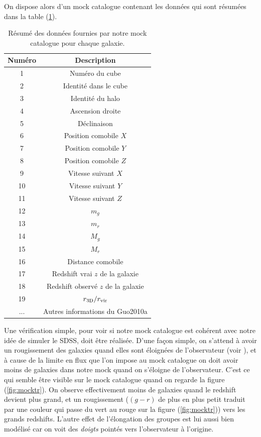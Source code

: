 On dispose alors d'un mock catalogue contenant les données qui sont résumées dans la table (\ref{tab:donnees}).
\begin{table}[htb]
        \footnotesize
	\centering
	\begin{tabular}{| >{\columncolor{bleu2}} c| >{\columncolor{bleu3}} c|}
	        \hline
		\rowcolor{viol}Numéro & Description \\
		\hline\hline
		1 & Numéro du cube \\ \hline
		2 & Identité dans le cube \\ \hline
		3 & Identité du halo \\ \hline
		4 & Ascension droite \\ \hline
		5 & Déclinaison \\ \hline
		6 & Position comobile $X$ \\ \hline
		7 & Position comobile $Y$ \\ \hline
		8 & Position comobile $Z$ \\ \hline
		9 & Vitesse suivant $X$ \\ \hline
		10 & Vitesse suivant $Y$ \\ \hline
		11 & Vitesse suivant $Z$ \\ \hline
		12 & $m_g$ \\ \hline
		13 & $m_r$ \\ \hline
		14 & $M_g$ \\ \hline
		15 & $M_r$ \\ \hline
		16 & Distance comobile \\ \hline
		17 & Redshift vrai $z$ de la galaxie \\ \hline
		18 & Redshift observé $z$ de la galaxie \\ \hline
		19 & $r_{\rm{3D}}/r_{\rm{vir}}$ \\ \hline
		... & Autres informations du Guo2010a \\
		\hline
	\end{tabular}
	\caption{\footnotesize{}Résumé des données fournies par notre mock catalogue pour chaque galaxie.}
	\label{tab:donnees}
	\normalsize
\end{table}
Une vérification simple, pour voir si notre mock catalogue est cohérent avec notre idée de simuler le SDSS, doit être réalisée.
D'une façon simple, on s'attend à avoir un rougissement des galaxies quand elles sont éloignées de l'observateur (voir
\citet{Blaizot+05}), et à cause de la limite en flux que l'on impose au mock catalogue on doit avoir moins de galaxies dans notre
mock quand on s'éloigne de l'observateur. C'est ce qui semble être visible sur le mock catalogue quand on regarde la figure
(\ref{fig:mocktr}). On observe effectivement moins de galaxies quand le redshift devient plus grand, et un rougissement ($(g-r)$ de
plus en plus petit traduit par une couleur qui passe du vert au rouge sur la figure (\ref{fig:mocktr})) vers les grands redshifts.
L'autre effet de l'élongation des groupes est lui aussi bien modélisé car on voit des \emph{doigts} pointés vers l'observateur à
l'origine.


